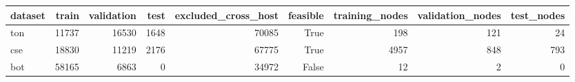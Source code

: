 \begin{tabular}{lrrrrrrrr}
\toprule
dataset & train & validation & test & excluded\_cross\_host & feasible & training\_nodes & validation\_nodes & test\_nodes \\
\midrule
ton & 11737 & 16530 & 1648 & 70085 & True & 198 & 121 & 24 \\
cse & 18830 & 11219 & 2176 & 67775 & True & 4957 & 848 & 793 \\
bot & 58165 & 6863 & 0 & 34972 & False & 12 & 2 & 0 \\
\bottomrule
\end{tabular}
